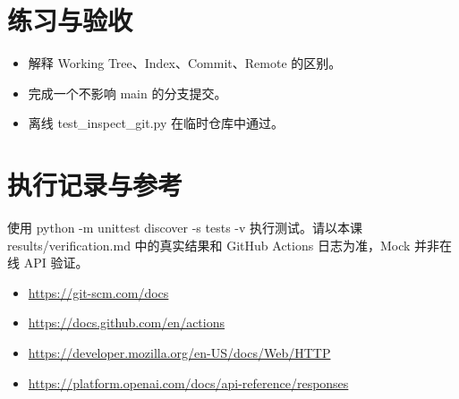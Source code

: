 \documentclass[UTF8,11pt,a4paper]{ctexart}
\begin{document}
\section{练习与验收}
\begin{itemize}
\item 解释 Working Tree、Index、Commit、Remote 的区别。
\item 完成一个不影响 main 的分支提交。
\item 离线 test\_inspect\_git.py 在临时仓库中通过。
\end{itemize}
\section{执行记录与参考}
使用 python -m unittest discover -s tests -v 执行测试。请以本课 results/verification.md 中的真实结果和 GitHub Actions 日志为准，Mock 并非在线 API 验证。
\begin{itemize}
\item \url{https://git-scm.com/docs}
\item \url{https://docs.github.com/en/actions}
\item \url{https://developer.mozilla.org/en-US/docs/Web/HTTP}
\item \url{https://platform.openai.com/docs/api-reference/responses}
\end{itemize}
\end{document}
